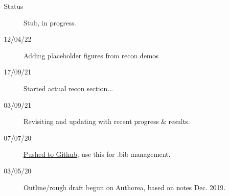 \begin{description}
\item [{Status}] Stub, in progress.
\item [{12/04/22}] Adding placeholder figures from recon demos
\item [{17/09/21}] Started actual recon section...
\item [{03/09/21}] Revisiting and updating with recent progress \& results.
\item [{07/07/20}] \href{https://github.com/phockett/Extracting-Molecular-Frame-Photoionization-Dynamics-from-Experimental-Data}{Pushed to Github}, use this for .bib management.
\item [{03/05/20}] Outline/rough draft begun on Authorea, based on notes Dec. 2019.
\end{description}
